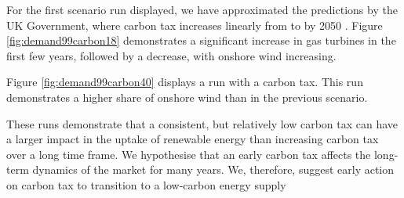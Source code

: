 For the first scenario run displayed, we have approximated the predictions by the UK Government, where carbon tax increases linearly from  to  by 2050 \cite{Department2016}. Figure \ref{fig:demand99carbon18} demonstrates a significant increase in gas turbines in the first few years, followed by a decrease, with onshore wind increasing.

Figure \ref{fig:demand99carbon40} displays a run with a  carbon tax. This run demonstrates a higher share of onshore wind than in the previous scenario. 

These runs demonstrate that a consistent, but relatively low carbon tax can have a larger impact in the uptake of renewable energy than increasing carbon tax over a long time frame. We hypothesise that an early carbon tax affects the long-term dynamics of the market for many years. We, therefore, suggest early action on carbon tax to transition to a low-carbon energy supply


%






